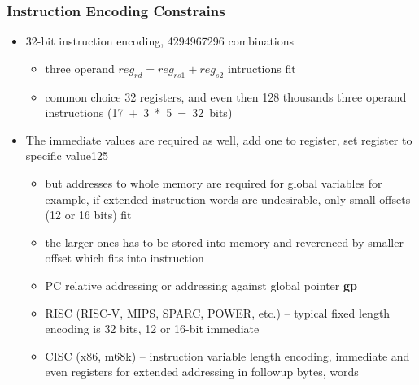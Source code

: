 \documentclass{beamer}
\begin{document}
\begin{frame}
\frametitle{Instruction Encoding Constrains}

\begin{itemize}

\item 32-bit instruction encoding, 4294967296 combinations
\begin{itemize}
\item three operand \texttt{$reg_{rd} = reg_{rs1} + reg_{s2}$} intructions fit
\item common choice 32 registers, and even then 128 thousands three operand instructions (17~+~3~*~5~=~32~bits)
\end{itemize}
\item The immediate values are required as well, add one to register, set register to specific value125
\begin{itemize}
\item but addresses to whole memory are required for global variables for example, if extended instruction words are undesirable, only small offsets (12 or 16 bits) fit
\item the larger ones has to be stored into memory and reverenced by smaller offset which fits into instruction
\item PC relative addressing or addressing against global pointer \textbf{gp}
\item RISC (RISC-V, MIPS, SPARC, POWER, etc.) --  typical fixed length encoding is 32 bits, 12 or 16-bit immediate
\item CISC (x86, m68k) -- instruction variable length encoding, immediate and even registers for extended addressing in followup bytes, words
\end{itemize}
\end{itemize}
\end{frame}
\end{document}
